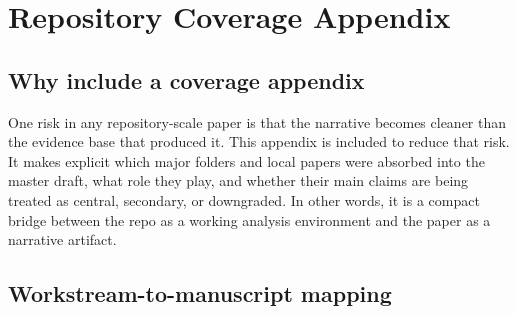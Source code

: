 \appendix
\section{Repository Coverage Appendix}

\subsection{Why include a coverage appendix}

One risk in any repository-scale paper is that the narrative becomes cleaner than the evidence base that produced it. This appendix is included to reduce that risk. It makes explicit which major folders and local papers were absorbed into the master draft, what role they play, and whether their main claims are being treated as central, secondary, or downgraded. In other words, it is a compact bridge between the repo as a working analysis environment and the paper as a narrative artifact.

\subsection{Workstream-to-manuscript mapping}

